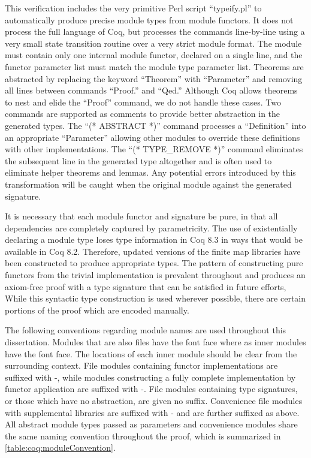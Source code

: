 This verification includes the very primitive Perl script ``typeify.pl'' to automatically produce precise module types from module functors.
It does not process the full language of Coq, but processes the commands line-by-line using a very small state transition routine over a very strict module format.
The module must contain only one internal module functor, declared on a single line, and the functor parameter list must match the module type parameter list.
Theorems are abstracted by replacing the keyword ``Theorem'' with ``Parameter'' and removing all lines between commands ``Proof.'' and ``Qed.''
Although Coq allows theorems to nest and elide the ``Proof'' command, we do not handle these cases.
Two commands are supported as comments to provide better abstraction in the generated types.
The ``(* ABSTRACT *)'' command processes a ``Definition'' into an appropriate ``Parameter'' allowing other modules to override these definitions with other implementations.
The ``(* TYPE\_REMOVE *)'' command eliminates the subsequent line in the generated type altogether and is often used to eliminate helper theorems and lemmas.
Any potential errors introduced by this transformation will be caught when the original module against the generated signature.

It is necessary that each module functor and signature be pure, in that all dependencies are completely captured by parametricity.
The use of existentially declaring a module type loses type information in Coq 8.3 in ways that would be available in Coq 8.2.
Therefore, updated versions of the \COQFMap{} finite map libraries have been constructed to produce appropriate types.
The pattern of constructing pure functors from the trivial implementation is prevalent throughout \TMmodelName{} and produces an axiom-free proof with a type signature that can be satisfied in future efforts,
While this syntactic type construction is used wherever possible, there are certain portions of the proof which are encoded manually.

The following conventions regarding module names are used throughout this dissertation.
Modules that are also files have the  font face where as inner modules have the  font face.
The locations of each inner module should be clear from the surrounding context.
File modules containing functor implementations are suffixed with -, while modules constructing a fully complete implementation by functor application are suffixed with -.
File modules containing type signatures, or those which have no abstraction, are given no suffix.
Convenience file modules with supplemental libraries are suffixed with - and are further suffixed as above.
All abstract module types passed as parameters and convenience modules share the same naming convention throughout the proof, which is summarized in \cref{table:coq:moduleConvention}.

